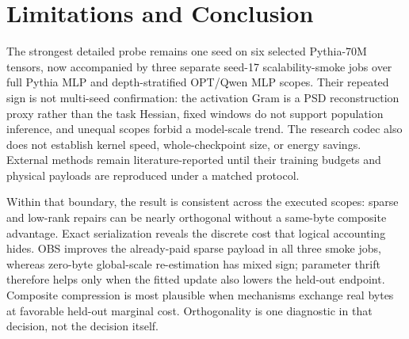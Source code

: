 \section{Limitations and Conclusion}
\label{sec:conclusion}

The strongest detailed probe remains one seed on six selected Pythia-70M
tensors, now accompanied by three separate seed-17 scalability-smoke jobs over
full Pythia MLP and depth-stratified OPT/Qwen MLP scopes.  Their repeated sign
is not multi-seed confirmation: the activation Gram is a PSD reconstruction
proxy rather than the task Hessian, fixed windows do not support population
inference, and unequal scopes forbid a model-scale trend.  The research codec
also does not establish kernel speed, whole-checkpoint size, or energy savings.
External methods remain literature-reported until their training budgets and
physical payloads are reproduced under a matched protocol.

Within that boundary, the result is consistent across the executed scopes:
sparse and low-rank repairs can be nearly orthogonal without a same-byte
composite advantage.  Exact serialization reveals the discrete cost that
logical accounting hides.  OBS improves the already-paid sparse payload in all
three smoke jobs, whereas zero-byte global-scale re-estimation has mixed sign;
parameter thrift therefore helps only when the fitted update also lowers the
held-out endpoint.  Composite compression is most plausible when mechanisms
exchange real bytes at favorable held-out marginal cost.  Orthogonality is one
diagnostic in that decision, not the decision itself.
